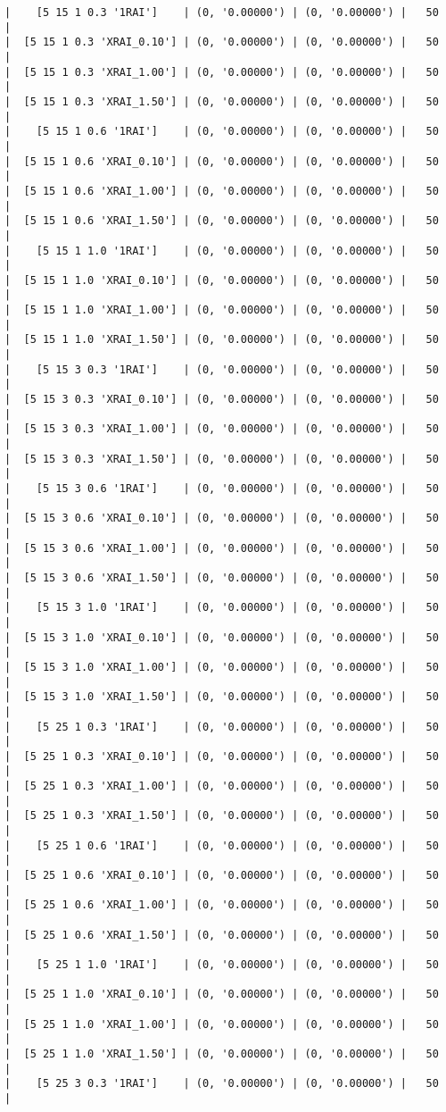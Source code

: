 \documentclass{article}
\begin{document}
\begin{verbatim}
|    [5 15 1 0.3 '1RAI']    | (0, '0.00000') | (0, '0.00000') |   50  |
|  [5 15 1 0.3 'XRAI_0.10'] | (0, '0.00000') | (0, '0.00000') |   50  |
|  [5 15 1 0.3 'XRAI_1.00'] | (0, '0.00000') | (0, '0.00000') |   50  |
|  [5 15 1 0.3 'XRAI_1.50'] | (0, '0.00000') | (0, '0.00000') |   50  |
|    [5 15 1 0.6 '1RAI']    | (0, '0.00000') | (0, '0.00000') |   50  |
|  [5 15 1 0.6 'XRAI_0.10'] | (0, '0.00000') | (0, '0.00000') |   50  |
|  [5 15 1 0.6 'XRAI_1.00'] | (0, '0.00000') | (0, '0.00000') |   50  |
|  [5 15 1 0.6 'XRAI_1.50'] | (0, '0.00000') | (0, '0.00000') |   50  |
|    [5 15 1 1.0 '1RAI']    | (0, '0.00000') | (0, '0.00000') |   50  |
|  [5 15 1 1.0 'XRAI_0.10'] | (0, '0.00000') | (0, '0.00000') |   50  |
|  [5 15 1 1.0 'XRAI_1.00'] | (0, '0.00000') | (0, '0.00000') |   50  |
|  [5 15 1 1.0 'XRAI_1.50'] | (0, '0.00000') | (0, '0.00000') |   50  |
|    [5 15 3 0.3 '1RAI']    | (0, '0.00000') | (0, '0.00000') |   50  |
|  [5 15 3 0.3 'XRAI_0.10'] | (0, '0.00000') | (0, '0.00000') |   50  |
|  [5 15 3 0.3 'XRAI_1.00'] | (0, '0.00000') | (0, '0.00000') |   50  |
|  [5 15 3 0.3 'XRAI_1.50'] | (0, '0.00000') | (0, '0.00000') |   50  |
|    [5 15 3 0.6 '1RAI']    | (0, '0.00000') | (0, '0.00000') |   50  |
|  [5 15 3 0.6 'XRAI_0.10'] | (0, '0.00000') | (0, '0.00000') |   50  |
|  [5 15 3 0.6 'XRAI_1.00'] | (0, '0.00000') | (0, '0.00000') |   50  |
|  [5 15 3 0.6 'XRAI_1.50'] | (0, '0.00000') | (0, '0.00000') |   50  |
|    [5 15 3 1.0 '1RAI']    | (0, '0.00000') | (0, '0.00000') |   50  |
|  [5 15 3 1.0 'XRAI_0.10'] | (0, '0.00000') | (0, '0.00000') |   50  |
|  [5 15 3 1.0 'XRAI_1.00'] | (0, '0.00000') | (0, '0.00000') |   50  |
|  [5 15 3 1.0 'XRAI_1.50'] | (0, '0.00000') | (0, '0.00000') |   50  |
|    [5 25 1 0.3 '1RAI']    | (0, '0.00000') | (0, '0.00000') |   50  |
|  [5 25 1 0.3 'XRAI_0.10'] | (0, '0.00000') | (0, '0.00000') |   50  |
|  [5 25 1 0.3 'XRAI_1.00'] | (0, '0.00000') | (0, '0.00000') |   50  |
|  [5 25 1 0.3 'XRAI_1.50'] | (0, '0.00000') | (0, '0.00000') |   50  |
|    [5 25 1 0.6 '1RAI']    | (0, '0.00000') | (0, '0.00000') |   50  |
|  [5 25 1 0.6 'XRAI_0.10'] | (0, '0.00000') | (0, '0.00000') |   50  |
|  [5 25 1 0.6 'XRAI_1.00'] | (0, '0.00000') | (0, '0.00000') |   50  |
|  [5 25 1 0.6 'XRAI_1.50'] | (0, '0.00000') | (0, '0.00000') |   50  |
|    [5 25 1 1.0 '1RAI']    | (0, '0.00000') | (0, '0.00000') |   50  |
|  [5 25 1 1.0 'XRAI_0.10'] | (0, '0.00000') | (0, '0.00000') |   50  |
|  [5 25 1 1.0 'XRAI_1.00'] | (0, '0.00000') | (0, '0.00000') |   50  |
|  [5 25 1 1.0 'XRAI_1.50'] | (0, '0.00000') | (0, '0.00000') |   50  |
|    [5 25 3 0.3 '1RAI']    | (0, '0.00000') | (0, '0.00000') |   50  |

\end{verbatim}
\end{document}

